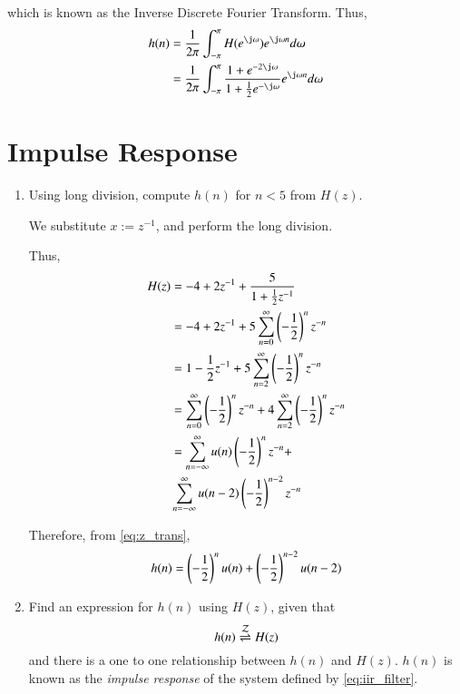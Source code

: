 \documentclass[journal,12pt,twocolumn]{IEEEtran}
\renewcommand\thesection{\arabic{section}}
\begin{document}
\begin{enumerate}[label=\thesection.\arabic*]
which is known as the Inverse Discrete Fourier Transform. Thus,
\begin{align}
	h(n) &= \frac{1}{2\pi}\int_{-\pi}^{\pi}H(e^{\j\omega})e^{\j\omega n}d\omega \\
		 &= \frac{1}{2\pi}\int_{-\pi}^{\pi}\frac{1 + e^{-2\j\omega}}{1 + \frac{1}{2}e^{-\j\omega}}e^{\j\omega n}d\omega
	\label{eq:idtft}
\end{align}
\end{enumerate}

\section{Impulse Response}
\begin{enumerate}[label=\thesection.\arabic*]

\item Using long division, compute $h(n)$ for $n < 5$ from $H(z)$.

\solution We substitute $x := z^{-1}$, and perform the long division.


Thus,
\begin{align}
	H(z) &= -4 + 2z^{-1} + \frac{5}{1 + \frac{1}{2}z^{-1}} \\
		 &= -4 + 2z^{-1} + 5\sum_{n = 0}^{\infty}\left(-\frac{1}{2}\right)^nz^{-n} \\
		 &= 1 - \frac{1}{2}z^{-1} + 5\sum_{n = 2}^{\infty}\left(-\frac{1}{2}\right)^nz^{-n} \\
		 &= \sum_{n = 0}^{\infty}\left(-\frac{1}{2}\right)^nz^{-n} + 4\sum_{n = 2}^{\infty}\left(-\frac{1}{2}\right)^nz^{-n} \\
		 &= \sum_{n = -\infty}^{\infty}u(n)\left(-\frac{1}{2}\right)^nz^{-n} + \nonumber \\
		 &\sum_{n = -\infty}^{\infty}u(n - 2)\left(-\frac{1}{2}\right)^{n - 2}z^{-n}
\end{align}

Therefore, from \eqref{eq:z_trans}, 
\begin{align}
	h(n) = \left(-\frac{1}{2}\right)^{n}u(n) + \left(-\frac{1}{2}\right)^{n-2}u(n-2)
\end{align}

\item \label{prob:impulse_resp}
Find an expression for $h(n)$ using $H(z)$, given that 
\begin{equation}
\label{eq:impulse_resp}
h(n) \overset{\mathcal{Z}}{ \rightleftharpoons} H(z)
\end{equation}
and there is a one to one relationship between $h(n)$ and $H(z)$. $h(n)$ is known as the {\em impulse response} of the
system defined by \eqref{eq:iir_filter}.


\end{enumerate}
\end{document}
